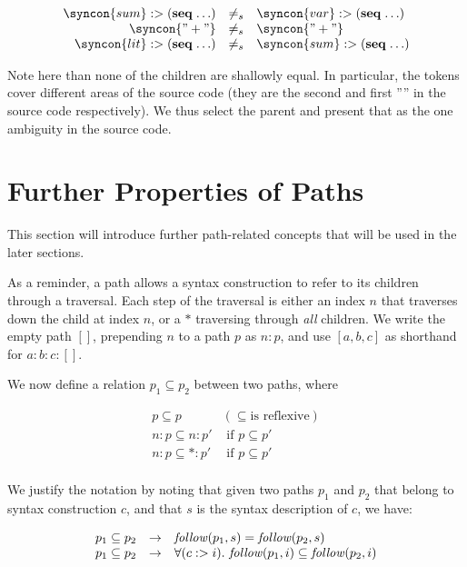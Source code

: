 \documentclass{kththesis}
\begin{document}
$$
\begin{array}{rcl}
\syncon{sum} :> (\seq \ldots)
& \not=_s &
\syncon{var} :> (\seq \ldots) \\

\syncon{"+"} & \not=_s & \syncon{"+"} \\

\syncon{lit} :> (\seq \ldots)
& \not=_s &
\syncon{sum} :> (\seq \ldots) \\
\end{array}
$$

Note here than none of the children are shallowly equal. In particular, the  tokens cover different areas of the source code (they are the second and first ''\syncon{+}'' in the source code respectively). We thus select the parent and present that as the one ambiguity in the source code.

\section{Further Properties of Paths} \label{sec:paths}

This section will introduce further path-related concepts that will be used in the later sections.

As a reminder, a path allows a syntax construction to refer to its children through a traversal. Each step of the traversal is either an index $n$ that traverses down the child at index $n$, or a $*$ traversing through \emph{all} children. We write the empty path $[]$, prepending $n$ to a path $p$ as $n : p$, and use $[a, b, c]$ as shorthand for $a : b : c : []$.

We now define a relation $p_1 \subseteq p_2$ between two paths, where

$$
\begin{array}{ll}
p \subseteq p & (\subseteq \text{is reflexive}) \\
n : p \subseteq n : p' & \text{ if } p \subseteq p' \\
n : p \subseteq * : p' & \text{ if } p \subseteq p' \\
\end{array}
$$

We justify the notation by noting that given two paths $p_1$ and $p_2$ that belong to syntax construction $c$, and that $s$ is the syntax description of $c$, we have:

$$
\begin{array}{rcl}
p_1 \subseteq p_2 & -> & \mathit{follow}(p_1, s) = \mathit{follow}(p_2, s) \\
p_1 \subseteq p_2 & -> & \forall (c :> i).\ \mathit{follow}(p_1, i) \subseteq \mathit{follow}(p_2, i) \\
\end{array}
$$
\end{document}
